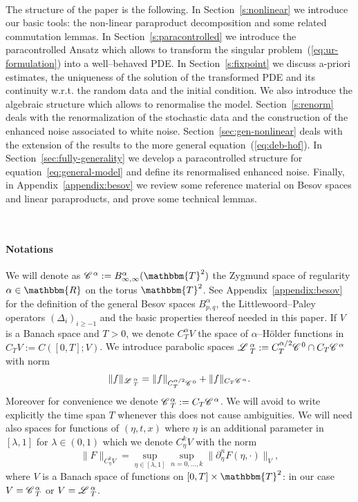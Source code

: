 \documentclass{amsart}
\newcommand{\assign}{:=}
\newcommand{\cdummy}{\cdot}
\theoremstyle{remark}
\theoremstyle{definition}
\newcommand{\CC}{\mathscr{C} \hspace{.1em}}
\newcommand{\LL}{\mathscr{L} \hspace{.2em}}
\begin{document}
\

The structure of the paper is the following. In Section~\ref{s:nonlinear} we
introduce our basic tools: the non-linear paraproduct decomposition and some
related commutation lemmas. In Section~\ref{s:paracontrolled} we introduce the
paracontrolled Ansatz which allows to transform the singular
problem~(\ref{eq:ur-formulation}) into a well--behaved PDE. In
Section~\ref{s:fixpoint} we discuss a-priori estimates, the uniqueness of the
solution of the transformed PDE and its continuity w.r.t. the random data and
the initial condition. We also introduce the algebraic structure which allows
to renormalise the model. Section~\ref{s:renorm} deals with the
renormalization of the stochastic data and the construction of the enhanced
noise associated to white noise. Section~\ref{sec:gen-nonlinear} deals with
the extension of the results to the more general equation~(\ref{eq:deb-hof}).
In Section~\ref{sec:fully-generality} we develop a paracontrolled structure
for equation~\ref{eq:general-model} and define its renormalised enhanced
noise. Finally, in Appendix~\ref{appendix:besov} we review some reference
material on Besov spaces and linear paraproducts, and prove some technical
lemmas.

\

\paragraph{Notations}We will denote as $\CC^{\alpha} \assign
B^{\alpha}_{\infty, \infty} (\mathbbm{T}^2)$ the Zygmund space of regularity
$\alpha \in \mathbbm{R}$ on the torus $\mathbbm{T}^2$. See
Appendix~\ref{appendix:besov} for the definition of the general Besov spaces
$B^{\alpha}_{p, q}$, the Littlewoord--Paley operators $(\Delta_i)_{i \geqslant
- 1}$ and the basic properties thereof needed in this paper. If $V$ is a
Banach space and $T > 0$, we denote $C_T^{\alpha} V$ the space of
$\alpha$--H{\"o}lder functions in $C_T V \assign C ([0, T] ; V)$. We introduce
parabolic spaces $\LL^{\alpha}_T \assign C_T^{\alpha / 2} \CC^0 \cap C_T
\CC^{\alpha}$ with norm
\begin{equation}
  \| f \|_{\LL^{\alpha}_T} = \| f \|_{C_T^{\alpha / 2} \CC^0} + \| f \|_{C_T
  \CC^{\alpha}} . \label{e:def-Lnorm}
\end{equation}
Moreover for convenience we denote $\CC_T^{\alpha} \assign C_T \CC^{\alpha}$.
We will avoid to write explicitly the time span $T$ whenever this does not
cause ambiguities. We will need also spaces for functions of $(\eta, t, x)$
where $\eta$ is an additional parameter in $[\lambda, 1]$ for $\lambda \in (0,
1)$ which we denote $C_{\eta}^k V$ with the norm
\begin{equation}
  \| F \|_{C_{\eta}^k V} = \sup_{\eta \in [\lambda, 1]} \sup_{n = 0, \ldots,
  k} \| \partial_{\eta}^n F (\eta, \cdummy) \|_V, \label{e:def-Cetanorm}
\end{equation}
where $V$ is a Banach space of functions on $[0, T] \times \mathbbm{T}^2$: in
our case $V = \CC_T^{\alpha}$ or $V = \LL^{\alpha}_T$.
\end{document}
